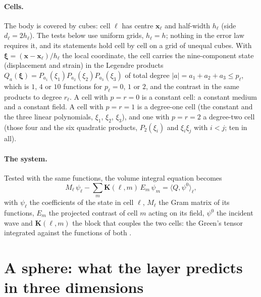 \documentclass[11pt,a4paper]{article}
\newcommand{\bx}{\mathbf{x}}
\newcommand{\bK}{\mathbf{K}}
\begin{document}
\paragraph{Cells.} The body is covered by cubes: cell $\ell$ has centre $\bx_\ell$ and half-width $h_\ell$
(side $d_\ell=2h_\ell$). The tests below use uniform grids, $h_\ell=h$; nothing in the error law requires
it, and its statements hold cell by cell on a grid of unequal cubes. With
$\boldsymbol\xi=(\bx-\bx_\ell)/h_\ell$ the local coordinate, the cell carries the nine-component state
(displacement and strain) in the Legendre products
$Q_a(\boldsymbol\xi)=P_{a_1}(\xi_1)P_{a_2}(\xi_2)P_{a_3}(\xi_3)$ of total degree $|a|=a_1+a_2+a_3\le p_\ell$,
which is $1$, $4$ or $10$ functions for $p_\ell=0$, $1$ or $2$, and the contrast in the same products to
degree $r_\ell$. A cell with $p=r=0$ is a constant cell: a constant medium and a constant field. A cell
with $p=r=1$ is a degree-one cell (the constant and the three linear polynomials, $\xi_1$, $\xi_2$,
$\xi_3$), and one with $p=r=2$ a degree-two cell (those four and the six quadratic products, $P_2(\xi_i)$
and $\xi_i\xi_j$ with $i<j$; ten in all).

\paragraph{The system.} Tested with the same functions, the volume integral equation becomes
\begin{equation}\label{eq:system}
  M_\ell\,\psi_\ell-\sum_{m}\bK(\ell,m)\,E_m\,\psi_m=\langle Q,\psi^0\rangle_\ell ,
\end{equation}
with $\psi_\ell$ the coefficients of the state in cell $\ell$, $M_\ell$ the Gram matrix of its
functions, $E_m$ the projected contrast of cell $m$ acting on its field, $\psi^0$ the incident wave and
$\bK(\ell,m)$ the block that couples the two cells: the Green's tensor integrated against the functions
of both \citep{NestorCoupling2026}.


\section{A sphere: what the layer predicts in three dimensions}\label{sec:sphere}
\end{document}
